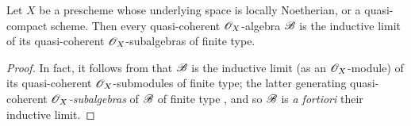 \begin{proposition}[9.6.6]
\label{1.9.6.6}
Let $X$ be a prescheme whose underlying space is locally Noetherian, or a quasi-compact scheme.
Then every quasi-coherent $\mathscr{O}_X$-algebra $\mathscr{B}$ is the inductive limit of its quasi-coherent $\mathscr{O}_X$-subalgebras of finite type.
\end{proposition}

\begin{proof}
\label{proof-1.9.6.6}
In fact, it follows from  that $\mathscr{B}$ is the inductive limit (as an $\mathscr{O}_X$-module) of its quasi-coherent $\mathscr{O}_X$-submodules of finite type; the latter generating quasi-coherent \emph{$\mathscr{O}_X$-subalgebras} of $\mathscr{B}$ of finite type , and so $\mathscr{B}$ is \emph{a fortiori} their inductive limit.
\end{proof}

